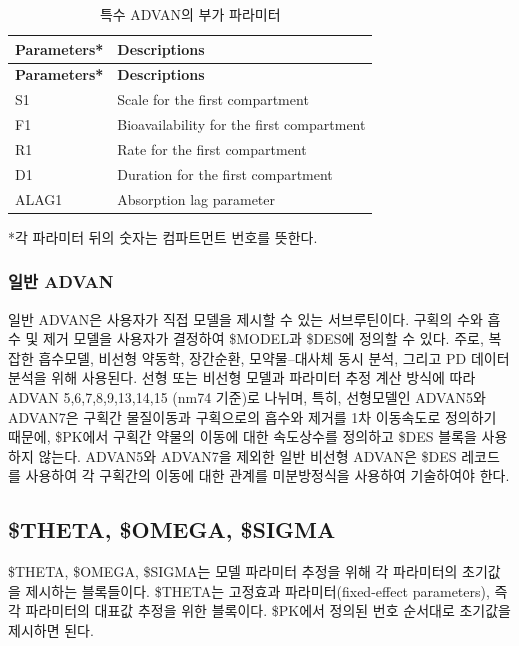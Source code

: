 \documentclass[
  10pt,
]{krantz}
\newenvironment{Shaded}{\begin{snugshade}}{\end{snugshade}}
\newcommand{\BuiltInTok}[1]{#1}
\newcommand{\DecValTok}[1]{\textcolor[rgb]{0.00,0.00,0.81}{#1}}
\newcommand{\KeywordTok}[1]{\textcolor[rgb]{0.13,0.29,0.53}{\textbf{#1}}}
\newcommand{\NormalTok}[1]{#1}
\begin{document}
\begin{longtable}[]{@{}ll@{}}
\caption{\label{tab:advan-param} 특수 ADVAN의 부가 파라미터}\tabularnewline
\toprule
\textbf{Parameters*} & \textbf{Descriptions}\tabularnewline
\midrule
\endfirsthead
\toprule
\textbf{Parameters*} & \textbf{Descriptions}\tabularnewline
\midrule
\endhead
S1 & Scale for the first compartment\tabularnewline
F1 & Bioavailability for the first compartment\tabularnewline
R1 & Rate for the first compartment\tabularnewline
D1 & Duration for the first compartment\tabularnewline
ALAG1 & Absorption lag parameter\tabularnewline
\bottomrule
\end{longtable}

*각 파라미터 뒤의 숫자는 컴파트먼트 번호를 뜻한다.

\hypertarget{uxc77cuxbc18-advan}{%
\subsubsection{일반 ADVAN}\label{uxc77cuxbc18-advan}}

일반 ADVAN은 사용자가 직접 모델을 제시할 수 있는 서브루틴이다. 구획의 수와 흡수 및 제거 모델을 사용자가 결정하여 \$MODEL과 \$DES에 정의할 수 있다. 주로, 복잡한 흡수모델, 비선형 약동학, 장간순환, 모약물--대사체 동시 분석, 그리고 PD 데이터 분석을 위해 사용된다. 선형 또는 비선형 모델과 파라미터 추정 계산 방식에 따라 ADVAN 5,6,7,8,9,13,14,15 (nm74 기준)로 나뉘며, 특히, 선형모델인 ADVAN5와 ADVAN7은 구획간 물질이동과 구획으로의 흡수와 제거를 1차 이동속도로 정의하기 때문에, \$PK에서 구획간 약물의 이동에 대한 속도상수를 정의하고 \$DES 블록을 사용하지 않는다. ADVAN5와 ADVAN7을 제외한 일반 비선형 ADVAN은 \$DES 레코드를 사용하여 각 구획간의 이동에 대한 관계를 미분방정식을 사용하여 기술하여야 한다.

\hypertarget{theta-omega-sigma}{%
\subsection{\$THETA, \$OMEGA, \$SIGMA}\label{theta-omega-sigma}}

\$THETA, \$OMEGA, \$SIGMA는 모델 파라미터 추정을 위해 각 파라미터의 초기값을 제시하는 블록들이다. \$THETA는 고정효과 파라미터(fixed-effect parameters), 즉 각 파라미터의 대표값 추정을 위한 블록이다. \$PK에서 정의된 번호 순서대로 초기값을 제시하면 된다.

\begin{Shaded}
\end{Shaded}
\end{document}
